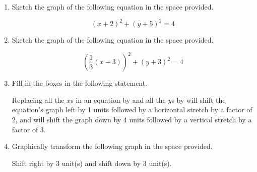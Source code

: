 \documentclass{article}
\begin{document}
\ActivityTitle[class={College Algebra}, number={2}, name={Transformations}]

\begin{enumerate}
\item Sketch the graph of the following equation in the space provided.

\[ (x + 2)^2 + (y + 5)^2 = 4 \]

\begin{center}
\CartesianPlane[axes=yes, h=7, w=7]
\end{center} \vspace{1cm}

\item Sketch the graph of the following equation in the space provided.

\[ \left(\frac{1}{3}(x - 3)\right)^2 + (y + 3)^2 = 4 \]

\begin{center}
\CartesianPlane[axes=yes, h=7, w=7]
\end{center} \vspace{1cm}

\newpage

\item Fill in the boxes in the following statement.

Replacing all the $x$s in an equation by \framebox{\begin{minipage}{3cm} \hfill\vspace{1cm} \end{minipage}} and all the $y$s by \framebox{\begin{minipage}{3cm} \hfill\vspace{1cm} \end{minipage}} will shift the equation's graph left by 1 units followed by a horizontal stretch by a factor of 2, and will shift the graph down by 4 units followed by a vertical stretch by a factor of 3.

   \vspace{3cm}

\item Graphically transform the following graph in the space provided.

\begin{center}
Shift right by 3 unit(s) and shift down by 3 unit(s).
\end{center}

\begin{center}
\MiniGraph[gadget=hellipse]
\end{center}


\end{enumerate}
\end{document}
